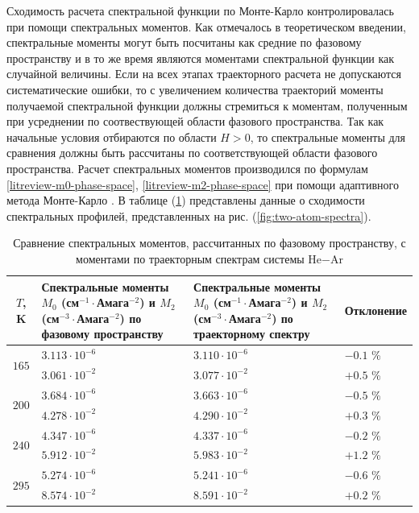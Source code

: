 Сходимость расчета спектральной функции по Монте-Карло контролировалась при помощи спектральных моментов. Как отмечалось в теоретическом введении, спектральные моменты могут быть посчитаны как средние по фазовому пространству и в то же время являются моментами спектральной функции как случайной величины. Если на всех этапах траекторного расчета не допускаются систематические ошибки, то с увеличением количества траекторий моменты получаемой спектральной функции должны стремиться к моментам, полученным при усреднении по соотвествующей области фазового пространства. Так как начальные условия отбираются по области $H > 0$, то спектральные моменты для сравнения должны быть рассчитаны по соответствующей области фазового пространства. Расчет спектральных моментов производился по формулам \eqref{litreview-m0-phase-space}, \eqref{litreview-m2-phase-space}  при помощи адаптивного метода Монте-Карло \cite{hep}. В таблице (\ref{table:hear-moments}) представлены данные о сходимости спектральных профилей, представленных на рис. (\ref{fig:two-atom-spectra}). 

\begin{table}[H]
    \begin{tabular}{c >{\centering}p{6cm} >{\centering}p{6cm} >{\centering}p{3cm}}
        \toprule
        $T$, K & Спектральные моменты $M_0$ (см$^{-1} \cdot$Амага$^{-2}$) и $M_2$ (см$^{-3} \cdot$Амага$^{-2}$) по фазовому пространству & Спектральные моменты $M_0$ (см$^{-1} \cdot$Амага$^{-2}$) и $M_2$ (см$^{-3} \cdot$Амага$^{-2}$) по траекторному спектру & Отклонение \tabularnewline
        \midrule
        \multirow{2}{*}{$165$}  & $3.113\cdot 10^{-6}$ & $3.110 \cdot 10^{-6}$ & $-0.1$ \%  \tabularnewline
                                & $3.061\cdot 10^{-2}$ & $3.077 \cdot 10^{-2}$ & $+0.5$ \%  \tabularnewline
        \midrule
        \multirow{2}{*}{$200$}  & $3.684\cdot 10^{-6}$ & $3.663 \cdot 10^{-6}$ & $-0.5$ \%  \tabularnewline
                                & $4.278\cdot 10^{-2}$ & $4.290 \cdot 10^{-2}$ & $+0.3$ \%  \tabularnewline
        \midrule
        \multirow{2}{*}{$240$}  & $4.347\cdot 10^{-6}$ & $4.337 \cdot 10^{-6}$ & $-0.2$ \%  \tabularnewline
                                & $5.912\cdot 10^{-2}$ & $5.983 \cdot 10^{-2}$ & $+1.2$ \%  \tabularnewline
        \midrule
        \multirow{2}{*}{$295$}  & $5.274\cdot 10^{-6}$ & $5.241 \cdot 10^{-6}$ & $-0.6$ \%  \tabularnewline
                                & $8.574\cdot 10^{-2}$ & $8.591 \cdot 10^{-2}$ & $+0.2$ \%  \tabularnewline
        \bottomrule
    \end{tabular}
    \caption{Сравнение спектральных моментов, рассчитанных по фазовому пространству, с моментами по траекторным спектрам системы He$-$Ar}
    \label{table:hear-moments}
\end{table}


